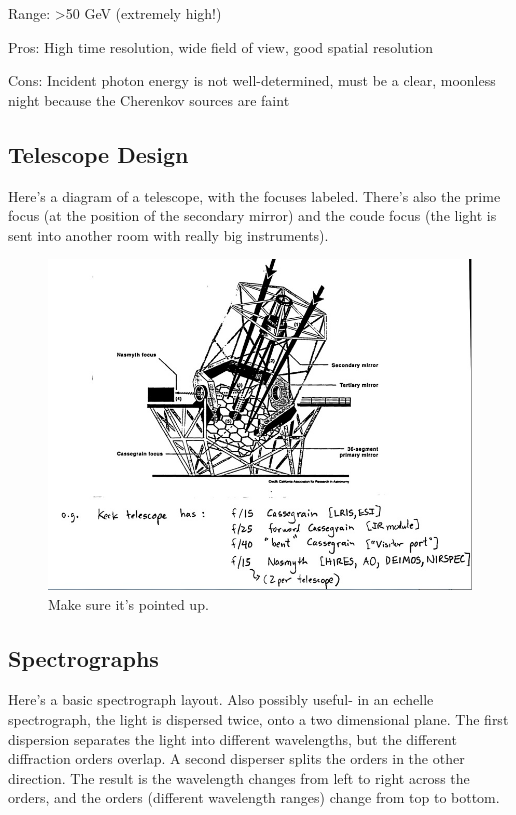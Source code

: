 \begin{enumerate}
\begin{itemize}
      Range: >50 GeV (extremely high!)
      
      Pros: High time resolution, wide field of view, good spatial resolution
      
      Cons: Incident photon energy is not well-determined, must be a clear, moonless night because the Cherenkov sources are faint
      \end{itemize}
      
\end{enumerate}


\subsection{Telescope Design}
Here's a diagram of a telescope, with the focuses labeled.  There's also the 
prime focus (at the position of the secondary mirror) and the coude focus 
(the light is sent into another room with really big instruments).  

\begin{figure}[!h]
\begin{center}
\includegraphics[width=\textwidth]{telescope.jpg}
\end{center}
\caption{Make sure it's pointed up.
\label{fig:telescope}}
\end{figure}

\subsection{Spectrographs}
Here's a basic spectrograph layout.  Also possibly useful- in an echelle 
spectrograph, the light is dispersed twice, onto a two dimensional plane.  
The first dispersion separates the light into different wavelengths, but 
the different diffraction orders overlap.  A second disperser splits the 
orders in the other direction.  The result is the wavelength changes from 
left to right across the orders, and the orders (different wavelength ranges) 
change from top to bottom.  

